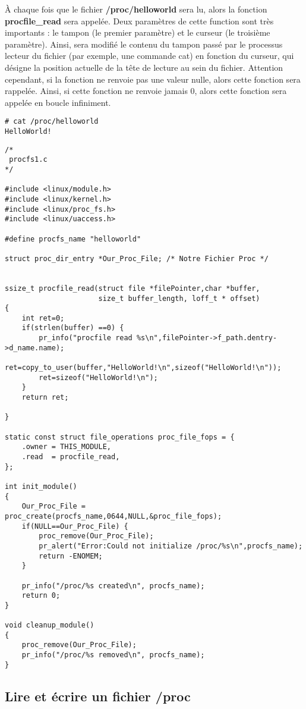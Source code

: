 \documentclass[11pt]{article}
\begin{document}
À chaque fois que le fichier \textbf{/proc/helloworld} sera lu, alors la fonction \textbf{procfile\_read} sera appelée. Deux paramètres de cette function sont très importants : le tampon (le premier paramètre) et le curseur (le troisième paramètre). Ainsi, sera modifié le contenu du tampon passé par le processus lecteur du fichier (par exemple, une commande cat) en fonction du curseur, qui désigne la position actuelle de la tête de lecture au sein du fichier. Attention cependant, si la fonction ne renvoie pas une valeur nulle, alors cette fonction sera rappelée. Ainsi, si cette fonction ne renvoie jamais 0, alors cette fonction sera appelée en boucle infiniment.

\begin{verbatim}
# cat /proc/helloworld
HelloWorld!
\end{verbatim}

\begin{verbatim}
/*
 procfs1.c
*/

#include <linux/module.h>
#include <linux/kernel.h>
#include <linux/proc_fs.h>
#include <linux/uaccess.h>

#define procfs_name "helloworld"

struct proc_dir_entry *Our_Proc_File; /* Notre Fichier Proc */


ssize_t procfile_read(struct file *filePointer,char *buffer,
                      size_t buffer_length, loff_t * offset)
{
    int ret=0;
    if(strlen(buffer) ==0) {
        pr_info("procfile read %s\n",filePointer->f_path.dentry->d_name.name);
        ret=copy_to_user(buffer,"HelloWorld!\n",sizeof("HelloWorld!\n"));
        ret=sizeof("HelloWorld!\n");
    }
    return ret;

}

static const struct file_operations proc_file_fops = {
    .owner = THIS_MODULE,
    .read  = procfile_read,
};

int init_module()
{
    Our_Proc_File = proc_create(procfs_name,0644,NULL,&proc_file_fops);
    if(NULL==Our_Proc_File) {
        proc_remove(Our_Proc_File);
        pr_alert("Error:Could not initialize /proc/%s\n",procfs_name);
        return -ENOMEM;
    }

    pr_info("/proc/%s created\n", procfs_name);
    return 0;
}

void cleanup_module()
{
    proc_remove(Our_Proc_File);
    pr_info("/proc/%s removed\n", procfs_name);
}
\end{verbatim}

\subsection*{Lire et écrire un fichier /proc}
\label{sec-7-1}
\end{document}

